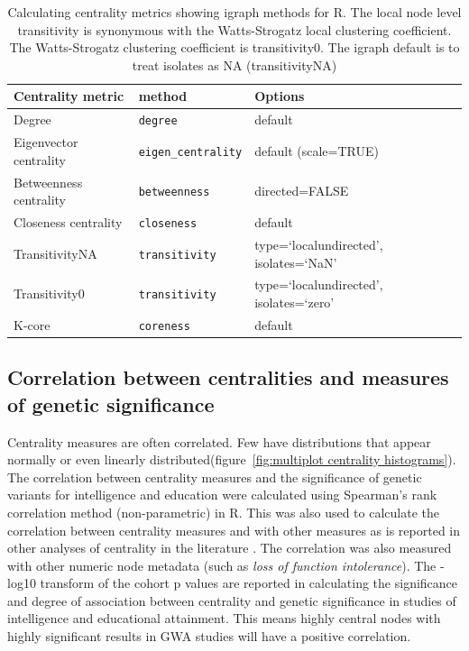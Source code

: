\begin{table}[]
    \centering
    \begin{tabular}{llll}
    \toprule
        Centrality metric & method & Options   \\
        \midrule
         Degree & \texttt{degree} & default   \\
         Eigenvector centrality & \texttt{eigen\_centrality} & default (scale=TRUE) \\
         Betweenness centrality & \texttt{betweenness} & directed=FALSE  \\
         Closeness centrality & \texttt{closeness} & default \\
         TransitivityNA & \texttt{transitivity} & type=`localundirected', isolates=`NaN'   \\
         Transitivity0 & \texttt{transitivity} & type=`localundirected', isolates=`zero'\\
         K-core & \texttt{coreness} & default  \\
         \bottomrule
    \end{tabular}
    \caption[Methods for calculating centrality measures]{Calculating centrality metrics showing igraph methods for R. The local node level transitivity is synonymous with the Watts-Strogatz local clustering coefficient. The Watts-Strogatz clustering coefficient is transitivity0. The igraph default is to treat isolates as NA (transitivityNA)}
    \label{tab:calculating centrality metrics}
\end{table}

\subsection{Correlation between centralities and measures of genetic significance}
\label{Correlation between centralities}
 Centrality measures are often correlated\cite{valente2008correlated}. Few have distributions that appear normally or even linearly distributed(figure~\ref{fig:multiplot centrality histograms}). The correlation between centrality measures and the significance of genetic variants for intelligence and education were calculated using Spearman's rank correlation method (non-parametric) in R. This was also used to calculate the correlation between centrality measures and with other measures as is reported in other analyses of centrality in the literature \cite{oldham2019consistency}. The correlation was also measured with other numeric node metadata (such as \textit{loss of function intolerance}).  The -log10 transform of the cohort p values are reported in calculating the significance and degree of association between centrality and genetic significance in studies of intelligence and educational attainment. This means highly central nodes with highly significant results in GWA studies will have a positive correlation. 


